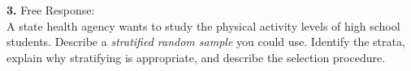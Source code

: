 \documentclass[10pt]{article}
\begin{document}
\vspace{0.1in}

\begin{practicebox}
\small
\textbf{3.} Free Response:\\
A state health agency wants to study the physical activity levels of high school
students. Describe a \emph{stratified random sample} you could use. Identify the
strata, explain why stratifying is appropriate, and describe the selection procedure.

\vspace{6pt}
\writeline\\[1pt]\writeline\\[1pt]\writeline\\[1pt]\writeline
\end{practicebox}
\end{document}
